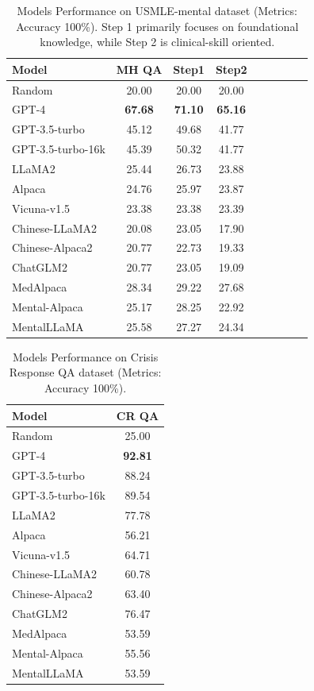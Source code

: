 \begin{table}[ht]
    \centering
    \footnotesize
    \begin{tabular}{l c c c c c c c c}
    \hline
    \textbf{Model} & \textbf{MH QA} & \textbf{Step1} & \textbf{Step2}\\
    \hline
    Random & 20.00 & 20.00 & 20.00\\
    \hline
    GPT-4 & \textbf{67.68} & \textbf{71.10} & \textbf{65.16}\\
    GPT-3.5-turbo & 45.12 & 49.68 & 41.77\\
    GPT-3.5-turbo-16k & 45.39 & 50.32 & 41.77\\
    \hline
    LLaMA2 & 25.44 & 26.73 & 23.88\\
    Alpaca & 24.76 & 25.97 & 23.87\\
    Vicuna-v1.5 & 23.38 & 23.38 & 23.39\\
    \hline
    Chinese-LLaMA2 & 20.08 & 23.05 & 17.90\\
    Chinese-Alpaca2 & 20.77 & 22.73 & 19.33\\
    ChatGLM2 & 20.77 & 23.05 & 19.09\\
    \hline
    MedAlpaca & 28.34 & 29.22 & 27.68\\
    Mental-Alpaca & 25.17 & 28.25 & 22.92\\
    MentalLLaMA & 25.58 & 27.27 & 24.34\\
    \hline
    \end{tabular}
    \caption{Models Performance on USMLE-mental dataset (Metrics: Accuracy 100\%). Step 1 primarily focuses on foundational knowledge, while Step 2 is clinical-skill oriented.}
    \label{tab: USMLE-mental}
\end{table}

\begin{table}[ht]
    \centering
    \footnotesize
    \begin{tabular}{l|c}
    \hline
    \textbf{Model} & \textbf{CR QA}\\
    \hline
    Random & 25.00\\
    \hline
    GPT-4 & \textbf{92.81}\\
    GPT-3.5-turbo & 88.24\\
    GPT-3.5-turbo-16k & 89.54\\
    \hline
    LLaMA2 & 77.78\\
    Alpaca & 56.21 \\
    Vicuna-v1.5 & 64.71\\
    \hline
    Chinese-LLaMA2 & 60.78\\
    Chinese-Alpaca2 & 63.40\\
    ChatGLM2 & 76.47\\
    \hline
    MedAlpaca & 53.59 \\
    Mental-Alpaca &  55.56 \\
    MentalLLaMA & 53.59 \\
    \hline
    \end{tabular}
    \caption{Models Performance on Crisis Response QA dataset (Metrics: Accuracy 100\%).}
    \label{tab: crisis response QA}
\end{table}


